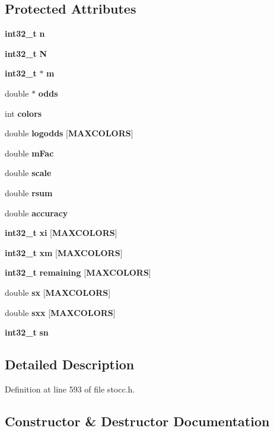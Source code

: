 \subsection*{Protected Attributes}
\begin{DoxyCompactItemize}
\item 
{\bf int32\-\_\-t} {\bf n}
\item 
{\bf int32\-\_\-t} {\bf N}
\item 
{\bf int32\-\_\-t} $\ast$ {\bf m}
\item 
double $\ast$ {\bf odds}
\item 
int {\bf colors}
\item 
double {\bf logodds} [{\bf M\-A\-X\-C\-O\-L\-O\-R\-S}]
\item 
double {\bf m\-Fac}
\item 
double {\bf scale}
\item 
double {\bf rsum}
\item 
double {\bf accuracy}
\item 
{\bf int32\-\_\-t} {\bf xi} [{\bf M\-A\-X\-C\-O\-L\-O\-R\-S}]
\item 
{\bf int32\-\_\-t} {\bf xm} [{\bf M\-A\-X\-C\-O\-L\-O\-R\-S}]
\item 
{\bf int32\-\_\-t} {\bf remaining} [{\bf M\-A\-X\-C\-O\-L\-O\-R\-S}]
\item 
double {\bf sx} [{\bf M\-A\-X\-C\-O\-L\-O\-R\-S}]
\item 
double {\bf sxx} [{\bf M\-A\-X\-C\-O\-L\-O\-R\-S}]
\item 
{\bf int32\-\_\-t} {\bf sn}
\end{DoxyCompactItemize}


\subsection{Detailed Description}


Definition at line 593 of file stocc.\-h.



\subsection{Constructor \& Destructor Documentation}
